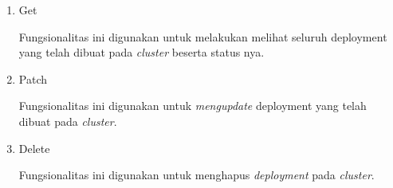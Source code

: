 \begin{enumerate}
  \item Get

        Fungsionalitas ini digunakan untuk melakukan melihat seluruh deployment yang telah dibuat pada \textit{cluster} beserta status nya.



  \item Patch

        Fungsionalitas ini digunakan untuk \textit{mengupdate} deployment yang telah dibuat pada \textit{cluster}.

  \item Delete

        Fungsionalitas ini digunakan untuk menghapus \textit{deployment} pada \textit{cluster}.

\end{enumerate}